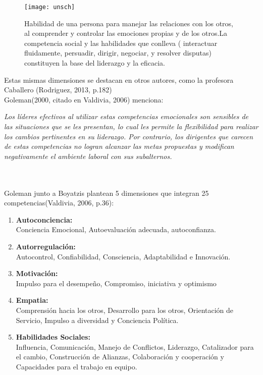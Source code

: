 \begin{enumerate}[label=\itembolasazules{\arabic*}]
\begin{figure}[!h]
		\begin{minipage}[b]{0.15\textwidth}
			\hspace{1cm} {\texttt{[image: unsch]}}%
		\end{minipage} \hfill \begin{minipage}[b]{0.83\textwidth}
			Habilidad de una persona para manejar las relaciones con los otros, al comprender y controlar las emociones propias y de los otros.La competencia social y las habilidades que conlleva ( interactuar fluidamente, persuadir, dirigir, negociar, y resolver disputas) constituyen la base del liderazgo y la eficacia.
	\end{minipage}
\end{figure} 
\end{enumerate}

Estas mismas dimensiones se destacan en otros autores, como la profesora Caballero (Rodriguez, 2013, p.182)
\\

Goleman(2000, citado en Valdivia, 2006) menciona:
\begin{definicion}[]
{ \it Los líderes efectivos al utilizar estas competencias emocionales son sensibles de las situaciones que se les presentan, lo cual les permite la flexibilidad para realizar los cambios pertinentes en su liderazgo. Por contrario, los dirigentes que carecen de estas competencias no logran alcanzar las metas propuestas y modifican negativamente el ambiente laboral con sus subalternos.}
\end{definicion}\\\\


Goleman junto a Boyatzis plantean 5 dimensiones que integran 25 competencias(Valdivia, 2006, p.36):%

\begin{enumerate}[label=\itembolasazules{\arabic*}]
\item \textbf{Autoconciencia:} \\
Conciencia Emocional, Autoevaluación adecuada, autoconfianza.
\item \textbf{ Autorregulación:}\\
 Autocontrol, Confiabilidad, Consciencia, Adaptabilidad e Innovación.
\item \textbf{Motivación:} \\
Impulso para el desempeño, Compromiso, iniciativa y optimismo
\item \textbf{Empatia:} \\
Comprensión hacia los otros, Desarrollo para los otros, Orientación de Servicio, Impulso a diversidad y Conciencia Política.
\item \textbf{Habilidades Sociales:} \\
Influencia, Comunicación, Manejo de Conflictos, Liderazgo, Catalizador para el cambio, Construcción de Alianzas, Colaboración y cooperación y Capacidades para el trabajo en equipo.
\end{enumerate}

